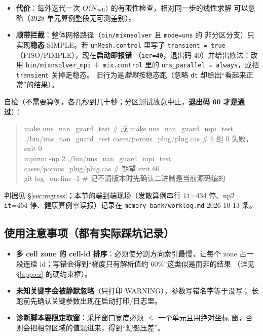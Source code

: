 \documentclass[11pt,a4paper]{ctexart}
\begin{document}
\begin{itemize}
        错配，故守卫取 60）。
        分区守卫是集合操作：所有 rank 同进退，不会留下挂死的 rank。
  \item \textbf{代价}：每外迭代一次 $O(N_{\rm cell})$ 的有限性检查，相对同一步的线性求解
        可以忽略（3928 单元算例整段无可测差别）。
  \item \textbf{顺带拦截}：整体网格路径（\texttt{bin/mixnsolver} 且 \texttt{mode=uns} 的
        非分区分支）只实现\textbf{稳态} SIMPLE。若 \texttt{unMesh.control} 里写了
        \texttt{transient = true}（PISO/PIMPLE），现在\textbf{启动即报错}
        （\texttt{ier=40}，退出码 40）并给出修法：改用
        \texttt{bin/mixnsolver\_mpi} ＋ \texttt{mix.control} 里的
        \texttt{uns\_parallel = always}，或把 \texttt{transient} 关掉走稳态。
        旧行为是\emph{静默}按稳态跑（忽略 \texttt{dt} 却给出``看起来正常''的结果）。
\end{itemize}

自检（不需要算例，各几秒到几十秒；分区测试故意中止，\textbf{退出码 60 才是通过}）：

\begin{quote}\ttfamily\small
make uns\_nan\_guard\_test \quad\# 或 make uns\_nan\_guard\_mpi\_test\\
./bin/uns\_nan\_guard\_test cases/porous\_plug/plug.cas \quad\# 6 组 0 失败，exit 0\\
mpirun -np 2 ./bin/uns\_nan\_guard\_mpi\_test cases/porous\_plug/plug.cas \quad\# 期望 exit 60\\
git log --oneline -1 \quad\# 记不清版本时先确认二进制是当前源码编的
\end{quote}

判据见 \S\ref{sec:regress}；本节的端到端现场（发散算例串行 \texttt{it}=434 停、np2
\texttt{it}=464 停、健康算例零误报）记录在 \texttt{memory-bank/worklog.md} 2026-10-13 条。

\subsection{使用注意事项（都有实际踩坑记录）}

\begin{itemize}\itemsep2pt
  \item \textbf{多 cell zone 的 cell-id 排序}：必须使分割方向索引最慢，让每个
        zone 占一段连续 id；写错会得到``梯度只有解析值约 60\%''这类似是而非的结果
        （详见 \S\ref{app:cz} 的硬约束框）。
  \item \textbf{未知关键字会被静默忽略}（只打印 WARNING），参数写错名字等于没写；
        长跑前先确认关键参数出现在启动打印/日志里。
  \item \textbf{诊断脚本要限定取窗}：采样窗口宽度必须 $\le$ 一个单元且用绝对坐标
        窗，否则会把相邻区域的值混进来，得到``幻影压差''。
\end{itemize}
\end{document}
